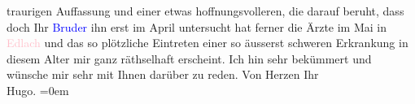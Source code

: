                     traurigen Auffassung und einer etwas hoffnungsvolleren, die darauf beruht, dass
                    doch Ihr \textcolor{blue}{Bruder}{} ihn {\pb}erst im April
                    untersucht hat ferner die Ärzte im Mai in \textcolor{pink}{Edlach}{}\ledrightnote{\textcolor{pink}{Edlach}} und das so plötzliche Eintreten einer so äusserst
                    schweren Erkrankung in diesem Alter mir ganz räthselhaft erscheint.\pend
           \pstart
           Ich hin sehr bekümmert und wünsche mir sehr mit Ihnen darüber zu reden. Von
                    Herzen Ihr{\\[\baselineskip]}\spacefill\mbox{Hugo.}\pend
           \leftskip=0em{}\endnumbering{}  
      
